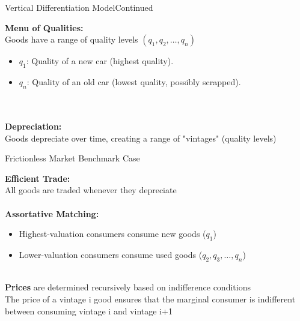 \documentclass[aspectratio=169]{beamer}  %
\begin{document}
\begin{frame}{Vertical Differentiation Model}{Continued}
\begin{spacing}{1.5}
{\small
    \textbf{Menu of Qualities:} \\
    Goods have a range of quality levels $(q_1, q_2, \dots, q_n)$\\

    \begin{itemize}
        \item $q_1$: Quality of a new car (highest quality).
        \item $q_n$: Quality of an old car (lowest quality, possibly scrapped).
    \end{itemize}\\
\quad\\
    \textbf{Depreciation:}\\
    Goods depreciate over time, creating a range of "vintages" (quality levels)\\

    }
\end{spacing}
\end{frame}

\begin{frame}{Frictionless Market }{Benchmark Case}
\begin{spacing}{1.5}
{\small
    \textbf{Efficient Trade:}\\
    All goods are traded whenever they depreciate\\
\quad\\
    \textbf{Assortative Matching:} 
    \begin{itemize}
        \item Highest-valuation consumers consume new goods ($q_1$)
        \item Lower-valuation consumers consume used goods ($q_2, q_3, \dots, q_n$)
    \end{itemize}
\quad\\
    \textbf{Prices} are determined recursively based on indifference conditions\\
     The price of a vintage i good ensures that the marginal consumer is indifferent between consuming vintage i and vintage i+1

    }
\end{spacing}
\end{frame}
\end{document}
